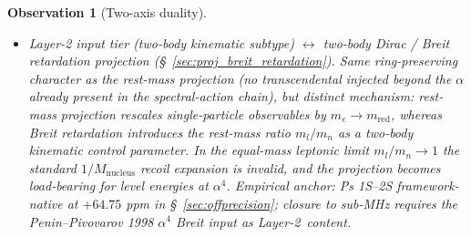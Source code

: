 \documentclass[11pt]{article}
\newtheorem{observation}{Observation}
\begin{document}
\begin{observation}[Two-axis duality]
\begin{itemize}
$\leftrightarrow$ observation / temporal-window projection.  This is
the categorical home of $\pi$ in the framework: every $\pi$ that
appears in a GeoVac observable can be traced to either (a)~a Hopf-base
calibration~$\pi$ (Hopf bundle / vector-photon promotion), (b)~a
spectral-action $\sqrt{\pi}\cdot\mathbb{Q}$ (heat-kernel coefficient),
or (c)~a temporal Matsubara $2\pi/\beta$ (this projection).  The
Casimir constant on $S^3 \times S^1_\beta$ is the cleanest
illustration: spatial-only Casimir is $1/240$ (rational, no $\pi$);
adding $S^1_\beta$ injects $\pi$ exactly through the Matsubara
mechanism.
\item \emph{Layer-2 input tier (two-body kinematic subtype)}
$\leftrightarrow$ two-body Dirac / Breit retardation projection
(\S~\ref{sec:proj_breit_retardation}).  Same ring-preserving
character as the rest-mass projection (no transcendental injected
beyond the $\alpha$ already present in the spectral-action chain),
but distinct mechanism: rest-mass projection rescales single-particle
observables by $m_e \to m_\text{red}$, whereas Breit retardation
introduces the rest-mass ratio $m_l/m_n$ as a two-body kinematic
control parameter.  In the equal-mass leptonic limit
$m_l/m_n \to 1$ the standard $1/M_\text{nucleus}$ recoil expansion
is invalid, and the projection becomes load-bearing for level
energies at $\alpha^4$.  Empirical anchor: Ps 1S--2S framework-native
at $+64.75$ ppm in \S~\ref{sec:offprecision}; closure to sub-MHz
requires the Penin--Pivovarov 1998 $\alpha^4$ Breit input as
Layer-2~content.
\end{itemize}
\end{observation}
\end{document}
